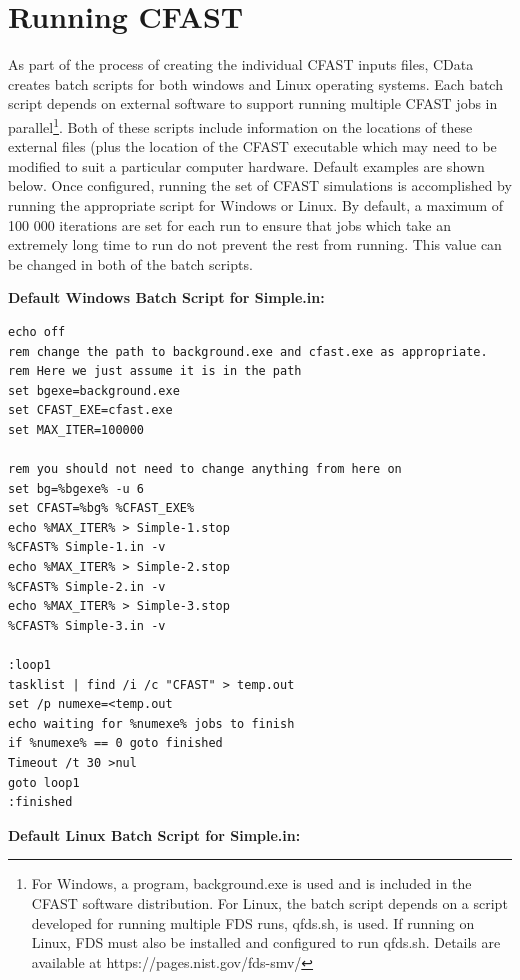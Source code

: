 \documentclass[12pt,twoside]{book}
\begin{document}
\section{Running CFAST}


As part of the process of creating the individual CFAST inputs files, CData creates batch scripts for both windows and Linux operating systems. Each batch script depends on external software to support running multiple CFAST jobs in parallel\footnote{For Windows, a program, {\ct background.exe} is used and is included in the CFAST software distribution. For Linux, the batch script depends on a script developed for running multiple FDS runs, {\ct qfds.sh}, is used. If running on Linux, FDS must also be installed and configured to run qfds.sh. Details are available at {\ct https://pages.nist.gov/fds-smv/}\emph{}}. Both of these scripts include information on the locations of these external files (plus the location of the CFAST executable which may need to be modified to suit a particular computer hardware. Default examples are shown below. Once configured, running the set of CFAST simulations is accomplished by running the appropriate script for Windows or Linux. By default, a maximum of 100 000 iterations are set for each run to ensure that jobs which take an extremely long time to run do not prevent the rest from running.  This value can be changed in both of the batch scripts.

\vspace{\baselineskip}
\noindent \textbf{Default Windows Batch Script for Simple.in:}

\begin{lstlisting}[basicstyle=\scriptsize]
echo off
rem change the path to background.exe and cfast.exe as appropriate.
rem Here we just assume it is in the path
set bgexe=background.exe
set CFAST_EXE=cfast.exe
set MAX_ITER=100000

rem you should not need to change anything from here on
set bg=%bgexe% -u 6
set CFAST=%bg% %CFAST_EXE%
echo %MAX_ITER% > Simple-1.stop
%CFAST% Simple-1.in -v
echo %MAX_ITER% > Simple-2.stop
%CFAST% Simple-2.in -v
echo %MAX_ITER% > Simple-3.stop
%CFAST% Simple-3.in -v

:loop1
tasklist | find /i /c "CFAST" > temp.out
set /p numexe=<temp.out
echo waiting for %numexe% jobs to finish
if %numexe% == 0 goto finished
Timeout /t 30 >nul
goto loop1
:finished
\end{lstlisting}

\vspace{\baselineskip}
\noindent \textbf{Default Linux Batch Script for Simple.in:}
\end{document}

